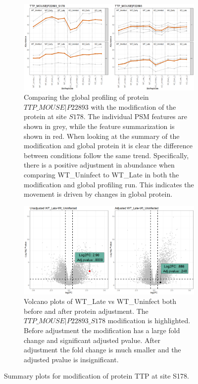 \documentclass{mcp}
\begin{document}
\begin{figure}[h!]
\centering
 \begin{subfigure}{\textwidth}
 \centering
	\includegraphics[width=.9\textwidth]{sim_new/No_Difference_Shigella_Profile_Plot}
	\caption{Comparing the global profiling of protein $TTP\_MOUSE|P22893$ with the modification of the protein at site $S178$. The individual PSM features are shown in grey, while the feature summarization is shown in red. When looking at the summary of the modification and global protein it is clear the difference between conditions follow the same trend. Specifically, there is a positive adjustment in abundance when comparing WT\_Uninfect to WT\_Late in both the modification and global profiling run. This indicates the movement is driven by changes in global protein.}
 \end{subfigure}
 \begin{subfigure}{\textwidth}
 \centering
	\includegraphics[width=.9\textwidth]{sim_new/No_Difference_Shigella_Volcano}
	\caption{Volcano plots of WT\_Late vs WT\_Uninfect both before and after protein adjustment. The $TTP\_MOUSE|P22893\_S178$ modification is highlighted. Before adjustment the modification has a large fold change and significant adjusted pvalue. After adjustment the fold change is much smaller and the adjusted pvalue is insignificant.}
 \end{subfigure}
\caption{Summary plots for modification of protein TTP at site S178.}
\label{fig:No_Diff_Shigella_PTM}
\end{figure}
\end{document}
